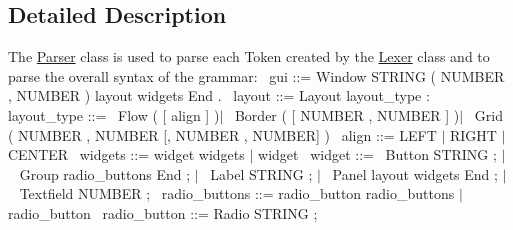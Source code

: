 \subsection{Detailed Description}
The \hyperlink{class_parser}{Parser} class is used to parse each Token created by the \hyperlink{class_lexer}{Lexer} class and to parse the overall syntax of the grammar\+:~\newline
 gui \+:\+:= Window S\+T\+R\+I\+NG \textquotesingle{}(\textquotesingle{} N\+U\+M\+B\+ER \textquotesingle{},\textquotesingle{} N\+U\+M\+B\+ER \textquotesingle{})\textquotesingle{} layout widgets End \textquotesingle{}.\textquotesingle{}~\newline
 layout \+:\+:= Layout layout\+\_\+type \textquotesingle{}\+:\textquotesingle{}~\newline
 layout\+\_\+type \+:\+:=~\newline
 Flow \textquotesingle{}(\textquotesingle{} \mbox{[} align \mbox{]} \textquotesingle{})\textquotesingle{}$\vert$~\newline
 Border \textquotesingle{}(\textquotesingle{} \mbox{[} N\+U\+M\+B\+ER \textquotesingle{},\textquotesingle{} N\+U\+M\+B\+ER \mbox{]} \textquotesingle{})\textquotesingle{}$\vert$~\newline
 Grid \textquotesingle{}(\textquotesingle{} N\+U\+M\+B\+ER \textquotesingle{},\textquotesingle{} N\+U\+M\+B\+ER \mbox{[}\textquotesingle{},\textquotesingle{} N\+U\+M\+B\+ER \textquotesingle{},\textquotesingle{} N\+U\+M\+B\+ER\mbox{]} \textquotesingle{})\textquotesingle{}~\newline
 align \+:\+:= L\+E\+FT $\vert$ R\+I\+G\+HT $\vert$ C\+E\+N\+T\+ER~\newline
 widgets \+:\+:= widget widgets $\vert$ widget~\newline
 widget \+:\+:=~\newline
 Button S\+T\+R\+I\+NG \textquotesingle{};\textquotesingle{} $\vert$~\newline
 Group radio\+\_\+buttons End \textquotesingle{};\textquotesingle{} $\vert$~\newline
 Label S\+T\+R\+I\+NG \textquotesingle{};\textquotesingle{} $\vert$~\newline
 Panel layout widgets End \textquotesingle{};\textquotesingle{} $\vert$~\newline
 Textfield N\+U\+M\+B\+ER \textquotesingle{};\textquotesingle{}~\newline
 radio\+\_\+buttons \+:\+:= radio\+\_\+button radio\+\_\+buttons $\vert$ radio\+\_\+button~\newline
 radio\+\_\+button \+:\+:= Radio S\+T\+R\+I\+NG \textquotesingle{};\textquotesingle{}~\newline


